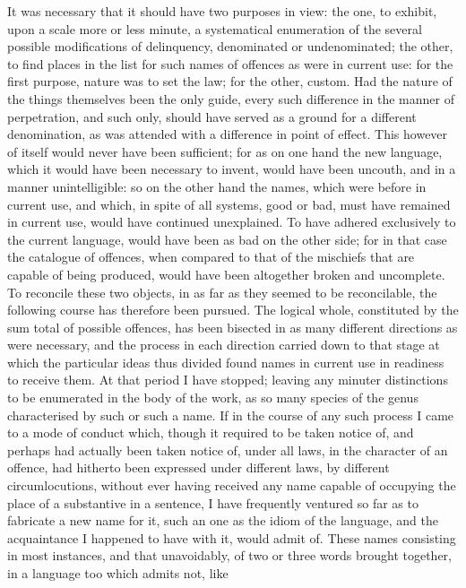 \documentclass[12pt]{report}
\begin{document}
It was necessary that it should have two purposes in view: the one, to
exhibit, upon a scale more or less minute, a systematical enumeration of
the several possible modifications of delinquency, denominated or
undenominated; the other, to find places in the list for such names of
offences as were in current use: for the first purpose, nature was to
set the law; for the other, custom. Had the nature of the things
themselves been the only guide, every such difference in the manner of
perpetration, and such only, should have served as a ground for a
different denomination, as was attended with a difference in point of
effect. This however of itself would never have been sufficient; for as
on one hand the new language, which it would have been necessary to
invent, would have been uncouth, and in a manner unintelligible: so on
the other hand the names, which were before in current use, and which,
in spite of all systems, good or bad, must have remained in current use,
would have continued unexplained. To have adhered exclusively to the
current language, would have been as bad on the other side; for in that
case the catalogue of offences, when compared to that of the mischiefs
that are capable of being produced, would have been altogether broken
and uncomplete.\\
To reconcile these two objects, in as far as they seemed to be
reconcilable, the following course has therefore been pursued. The
logical whole, constituted by the sum total of possible offences, has
been bisected in as many different directions as were necessary, and the
process in each direction carried down to that stage at which the
particular ideas thus divided found names in current use in readiness to
receive them. At that period I have stopped; leaving any minuter
distinctions to be enumerated in the body of the work, as so many
species of the genus characterised by such or such a name. If in the
course of any such process I came to a mode of conduct which, though it
required to be taken notice of, and perhaps had actually been taken
notice of, under all laws, in the character of an offence, had hitherto
been expressed under different laws, by different circumlocutions,
without ever having received any name capable of occupying the place of
a substantive in a sentence, I have frequently ventured so far as to
fabricate a new name for it, such an one as the idiom of the language,
and the acquaintance I happened to have with it, would admit of. These
names consisting in most instances, and that unavoidably, of two or
three words brought together, in a language too which admits not, like
\end{document}
